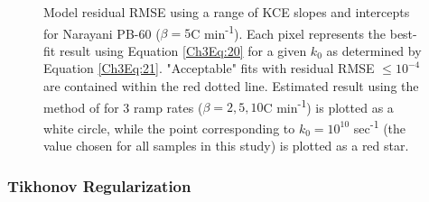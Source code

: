  \begin{figure}[t]
	\caption[Residual RMSE using a range of KCE slopes and intercepts for Narayani PB-60]{Model residual RMSE using a range of KCE slopes and intercepts for Narayani PB-60 ($\beta = 5$\textdegree C min\textsuperscript{-1}). Each pixel represents the best-fit result using Equation \ref{Ch3Eq:20} for a given $k_{0}$ as determined by Equation \ref{Ch3Eq:21}. "Acceptable" fits with residual RMSE $\leq 10^{-4}$ are contained within the red dotted line. Estimated result using the method of \citet{Miura:1998jf} for 3 ramp rates ($\beta = 2, 5, 10$\textdegree C min\textsuperscript{-1}) is plotted as a white circle, while the point corresponding to $k_{0} = 10^{10}$ sec\textsuperscript{-1} (the value chosen for all samples in this study) is plotted as a red star.}
	\label{Ch3Fig:5} 
\end{figure}

\subsubsection{Tikhonov Regularization}

